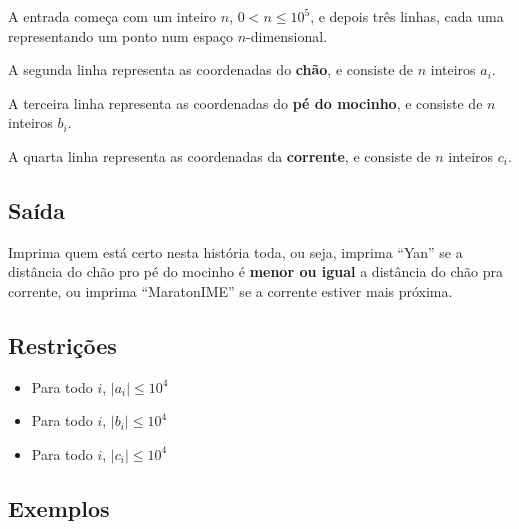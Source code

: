 A entrada começa com um inteiro $n$, $0 < n \leq 10^5$, e depois três linhas, cada uma
representando um ponto num espaço $n$-dimensional.

A segunda  linha representa as coordenadas do \textbf{chão}, e consiste de $n$ inteiros $a_i$.

A terceira linha representa as coordenadas do \textbf{pé do mocinho}, e consiste de $n$ inteiros $b_i$.

A quarta   linha representa as coordenadas da \textbf{corrente}, e consiste de $n$ inteiros $c_i$.

\subsection*{Saída}

Imprima quem está certo nesta história toda, ou seja, imprima ``Yan'' se a distância do
chão pro pé do mocinho é \textbf{menor ou igual} a distância do chão pra corrente, ou
imprima ``MaratonIME'' se a corrente estiver mais próxima.


\subsection*{Restrições}
\begin{itemize}
  \item Para todo $i$, $|a_i| \leq 10^4$
  \item Para todo $i$, $|b_i| \leq 10^4$
  \item Para todo $i$, $|c_i| \leq 10^4$
\end{itemize}

\subsection*{Exemplos}

\begin{center}

\end{center}
